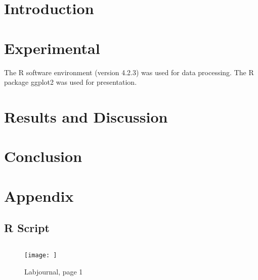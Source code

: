 \documentclass{PPACDW}
\title{}
\author{David Walk}{dawalk@student.ethz.ch}
\begin{document}
\maketitle
\newpage

\section*{Introduction}

\section*{Experimental}



The R software environment \cite{R} (version 4.2.3) was used for data processing. The R package ggplot2 \cite{ggplot2} was used for presentation.

\section*{Results and Discussion}

\section*{Conclusion}

\printbibliography

\appendix
  \section*{Appendix}
  \renewcommand\thefigure{A\arabic{figure}} %
  \renewcommand\thetable{A\arabic{table}} %
  \renewcommand\theequation{A\arabic{equation}} %
  \setcounter{figure}{0}
  \setcounter{table}{0}
  \setcounter{equation}{0}


\subsection*{R Script}
\begin{lstlisting}

\end{lstlisting}

\begin{figure}[H]
    \centering
    \texttt{[image: ]}
    \caption{Labjournal, page 1}
    \label{fig:my_label}
\end{figure}
\end{document}
